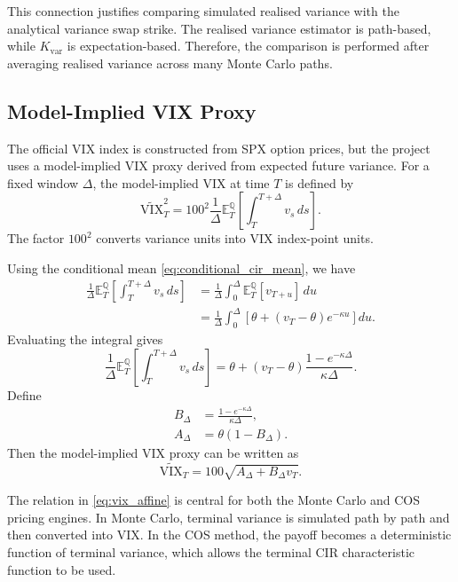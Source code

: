 This connection justifies comparing simulated realised variance with the analytical variance swap strike. The realised variance estimator is path-based, while \(K_{\mathrm{var}}\) is expectation-based. Therefore, the comparison is performed after averaging realised variance across many Monte Carlo paths.

\subsection{Model-Implied VIX Proxy}

The official VIX index is constructed from SPX option prices, but the project uses a model-implied VIX proxy derived from expected future variance. For a fixed window \(\Delta\), the model-implied VIX at time \(T\) is defined by
\begin{equation}
\widetilde{\mathrm{VIX}}_T^2
=
100^2
\frac{1}{\Delta}
\mathbb{E}^{\mathbb{Q}}_T
\left[
\int_T^{T+\Delta}v_s\,ds
\right].
\label{eq:vix_proxy_definition}
\end{equation}
The factor \(100^2\) converts variance units into VIX index-point units.

Using the conditional mean \eqref{eq:conditional_cir_mean}, we have
\begin{align}
\frac{1}{\Delta}
\mathbb{E}^{\mathbb{Q}}_T
\left[
\int_T^{T+\Delta}v_s\,ds
\right]
&=
\frac{1}{\Delta}
\int_0^\Delta
\mathbb{E}^{\mathbb{Q}}_T[v_{T+u}]\,du \\
&=
\frac{1}{\Delta}
\int_0^\Delta
\left[
\theta+(v_T-\theta)e^{-\kappa u}
\right]du.
\end{align}
Evaluating the integral gives
\begin{equation}
\frac{1}{\Delta}
\mathbb{E}^{\mathbb{Q}}_T
\left[
\int_T^{T+\Delta}v_s\,ds
\right]
=
\theta+(v_T-\theta)
\frac{1-e^{-\kappa\Delta}}{\kappa\Delta}.
\end{equation}
Define
\begin{align}
B_\Delta
&=
\frac{1-e^{-\kappa\Delta}}{\kappa\Delta},
\label{eq:b_delta}\\
A_\Delta
&=
\theta(1-B_\Delta).
\label{eq:a_delta}
\end{align}
Then the model-implied VIX proxy can be written as
\begin{equation}
\boxed{
\widetilde{\mathrm{VIX}}_T
=
100\sqrt{A_\Delta+B_\Delta v_T}.
}
\label{eq:vix_affine}
\end{equation}

The relation in \eqref{eq:vix_affine} is central for both the Monte Carlo and COS pricing engines. In Monte Carlo, terminal variance is simulated path by path and then converted into VIX. In the COS method, the payoff becomes a deterministic function of terminal variance, which allows the terminal CIR characteristic function to be used.

